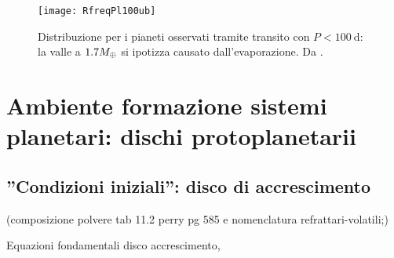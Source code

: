 

\begin{figure}[!ht]
	\centering \texttt{[image: RfreqPl100ub]} 
	\caption{Distribuzione per i pianeti osservati tramite transito con $P<\SI{100}{\day}$: la valle a $1.7M_{\oplus}{}$ si ipotizza causato dall'evaporazione. Da \cite{fulton2017california}.}\label{fig:RfreqPl100ub}
\end{figure}

{\let\clearpage\relax\let\cleardoublepage\relax
	\chapter{Ambiente formazione sistemi planetari: dischi protoplanetarii}
}

\section{''Condizioni iniziali'': disco di accrescimento}

\begin{workout}
	(composizione polvere tab 11.2 perry pg 585 e nomenclatura refrattari-volatili;)
\end{workout}

\begin{workout}
	Equazioni fondamentali disco accrescimento, 
\end{workout}

\begin{workout}
	
\end{workout}

